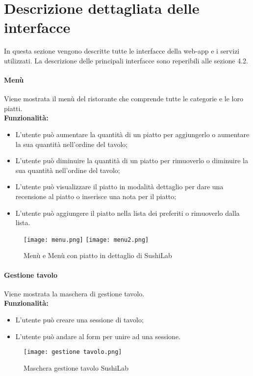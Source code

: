 \label{cap:appendice c}
\chapter{Descrizione dettagliata delle interfacce}
In questa sezione vengono descritte tutte le interfacce della web-app e i servizi utilizzati. La descrizione delle principali interfacce sono reperibili alle sezione 4.2.
\subsubsection{Menù}
Viene mostrata il menù del ristorante che comprende tutte le categorie e le loro piatti.\\
\textbf{Funzionalità:}
\begin{itemize}
    \item L'utente può aumentare la quantità di un piatto per aggiungerlo o aumentare la sua quantità nell'ordine del tavolo;
    \item L'utente può diminuire la quantità di un piatto per rimuoverlo o diminuire la sua quantità nell'ordine del tavolo;
    \item L'utente può visualizzare il piatto in modalità dettaglio per dare una recensione al piatto o inserisce una nota per il piatto;
    \item L'utente può aggiungere il piatto nella lista dei preferiti o rimuoverlo dalla lista.
\end{itemize}
\begin{figure}[H]
    \centering
    \texttt{[image: menu.png]}
    \texttt{[image: menu2.png]}
    \caption{Menù e Menù con piatto in dettaglio di SushiLab}
\end{figure}
\pagebreak

\subsubsection{Gestione tavolo}
Viene mostrata la maschera di gestione tavolo.\\
\textbf{Funzionalità:}
\begin{itemize}
    \item L'utente può creare una sessione di tavolo;
    \item L'utente può andare al form per unire ad una sessione.
\end{itemize}
\begin{figure}[H]
    \centering
    \texttt{[image: gestione tavolo.png]}
    \caption{Maschera gestione tavolo SushiLab}
\end{figure}
\pagebreak

